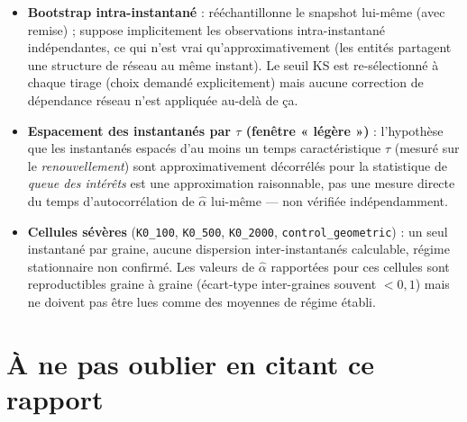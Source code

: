 \documentclass[11pt,a4paper]{article}
\newcommand{\code}[1]{\texttt{#1}}
\begin{document}
\begin{itemize}
  (seuil/2, seuil$\times$2, facteur d'admissibilité continu) ont toutes
  échoué à trancher, pour des raisons différentes --- ce n'est pas une
  preuve que la queue de Pareto n'existe pas, c'est une limite de
  puissance statistique de ce programme (populations et fenêtres
  temporelles simulées). Un programme futur avec des populations plus
  grandes et/ou des fenêtres plus longues pourrait rendre ce test à
  nouveau calculable.
\item \textbf{Bootstrap intra-instantané} : rééchantillonne le snapshot
  lui-même (avec remise) ; suppose implicitement les observations
  intra-instantané indépendantes, ce qui n'est vrai qu'approximativement
  (les entités partagent une structure de réseau au même instant). Le
  seuil KS est re-sélectionné à chaque tirage (choix demandé
  explicitement) mais aucune correction de dépendance réseau n'est
  appliquée au-delà de ça.
\item \textbf{Espacement des instantanés par $\tau$ (fenêtre « légère »)} :
  l'hypothèse que les instantanés espacés d'au moins un temps
  caractéristique $\tau$ (mesuré sur le \emph{renouvellement}) sont
  approximativement décorrélés pour la statistique de \emph{queue des
  intérêts} est une approximation raisonnable, pas une mesure directe du
  temps d'autocorrélation de $\hat\alpha$ lui-même --- non vérifiée
  indépendamment.
\item \textbf{Cellules sévères} (\code{K0\_100}, \code{K0\_500},
  \code{K0\_2000}, \code{control\_geometric}) : un seul instantané par
  graine, aucune dispersion inter-instantanés calculable, régime
  stationnaire non confirmé. Les valeurs de $\hat\alpha$ rapportées pour
  ces cellules sont reproductibles graine à graine (écart-type
  inter-graines souvent $<0{,}1$) mais ne doivent pas être lues comme
  des moyennes de régime établi.
\end{itemize}

\section*{À ne pas oublier en citant ce rapport}
\end{document}
